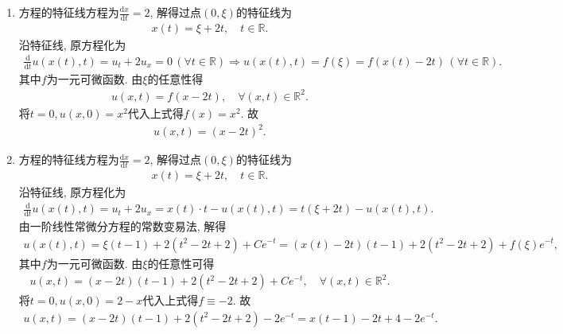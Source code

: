 \documentclass[../../main.tex]{subfiles}%
\begin{document}
\begin{solution}
\begin{enumerate}[(1)]
\item 方程的特征线方程为$\frac{\mathrm{d}x}{\mathrm{d}t}=2$, 解得过点$(0,\xi)$的特征线为
\begin{align*}
x(t)=\xi+2t,\quad t\in\mathbb{R}.
\end{align*}
沿特征线, 原方程化为
\begin{align*}
\frac{\mathrm{d}}{\mathrm{d}t}u(x(t),t)=u_t+2u_x=0\,(\forall t\in\mathbb{R}) \Longrightarrow u(x(t),t)=f(\xi)=f(x(t)-2t)\,(\forall t\in\mathbb{R}).
\end{align*}
其中$f$为一元可微函数. 由$\xi$的任意性得
\begin{align*}
u(x,t)=f(x-2t),\quad \forall (x,t)\in\mathbb{R}^2.
\end{align*}
将$t=0,u(x,0)=x^2$代入上式得$f(x)=x^2$. 故
\begin{align*}
u(x,t)=(x-2t)^2.
\end{align*}

\item 
方程的特征线方程为$\frac{\mathrm{d}x}{\mathrm{d}t}=2$, 解得过点$(0,\xi)$的特征线为
\begin{align*}
x(t)=\xi+2t,\quad t\in\mathbb{R}.
\end{align*}
沿特征线, 原方程化为
\begin{align*}
\frac{\mathrm{d}}{\mathrm{d}t}u(x(t),t)=u_t+2u_x=x(t)\cdot t-u(x(t),t)=t(\xi+2t)-u(x(t),t).
\end{align*}
由一阶线性常微分方程的常数变易法, 解得
\begin{align*}
u(x(t),t)=\xi(t-1)+2(t^2-2t+2)+Ce^{-t}=(x(t)-2t)(t-1)+2(t^2-2t+2)+f(\xi)e^{-t},
\end{align*}
其中$f$为一元可微函数. 由$\xi$的任意性可得
\begin{align*}
u(x,t)=(x-2t)(t-1)+2(t^2-2t+2)+Ce^{-t},\quad \forall (x,t)\in\mathbb{R}^2.
\end{align*}
将$t=0,u(x,0)=2-x$代入上式得$f\equiv -2$. 故
\begin{align*}
u(x,t)=(x-2t)(t-1)+2(t^2-2t+2)-2e^{-t}=x(t-1)-2t+4-2e^{-t}.
\end{align*}


\end{enumerate}
\end{solution}
\end{document}
